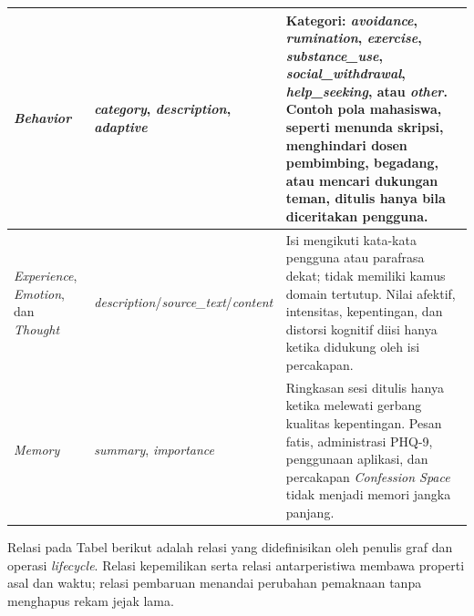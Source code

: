 \begin{longtable}{|>{\raggedright\arraybackslash}p{2.2cm}|>{\raggedright\arraybackslash}p{3.2cm}|>{\raggedright\arraybackslash}p{7.0cm}|}
\hline
\textit{Behavior} & \textit{category}, \textit{description}, \textit{adaptive} & Kategori: \textit{avoidance}, \textit{rumination}, \textit{exercise}, \textit{substance\_use}, \textit{social\_withdrawal}, \textit{help\_seeking}, atau \textit{other}. Contoh pola mahasiswa, seperti menunda skripsi, menghindari dosen pembimbing, begadang, atau mencari dukungan teman, ditulis hanya bila diceritakan pengguna.\\
\hline
\textit{Experience}, \textit{Emotion}, dan \textit{Thought} & \textit{description}/\textit{source\_text}/\textit{content} & Isi mengikuti kata-kata pengguna atau parafrasa dekat; tidak memiliki kamus domain tertutup. Nilai afektif, intensitas, kepentingan, dan distorsi kognitif diisi hanya ketika didukung oleh isi percakapan.\\
\hline
\textit{Memory} & \textit{summary}, \textit{importance} & Ringkasan sesi ditulis hanya ketika melewati gerbang kualitas kepentingan. Pesan fatis, administrasi PHQ-9, penggunaan aplikasi, dan percakapan \textit{Confession Space} tidak menjadi memori jangka panjang.\\
\hline
\end{longtable}
\endgroup

Relasi pada Tabel berikut adalah relasi yang didefinisikan oleh penulis graf dan operasi \textit{lifecycle}. Relasi kepemilikan serta relasi antarperistiwa membawa properti asal dan waktu; relasi pembaruan menandai perubahan pemaknaan tanpa menghapus rekam jejak lama.

